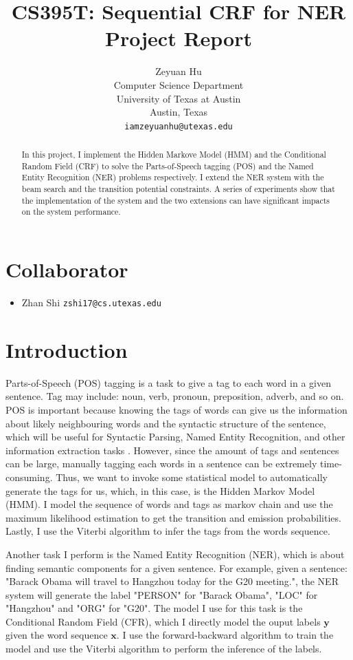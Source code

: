 \documentclass[11pt,a4paper]{article}
\title{CS395T: Sequential CRF for NER Project Report}
\author{Zeyuan Hu \\
  Computer Science Department \\
  University of Texas at Austin \\
  Austin, Texas \\
  {\tt iamzeyuanhu@utexas.edu} \\
}
\date{}
\begin{document}
\maketitle

\begin{abstract}
In this project, I implement the Hidden Markove Model (HMM) and the Conditional Random Field (CRF)
to solve the Parts-of-Speech tagging (POS) and the Named Entity Recognition (NER) problems
respectively. I extend the NER system with the beam search and the transition potential constraints.
A series of experiments show that the implementation of the system and the two extensions can have
significant impacts on the system performance.
\end{abstract}

\section{Collaborator}

\begin{itemize}
\item Zhan Shi {\tt zshi17@cs.utexas.edu}
\end{itemize}

\section{Introduction}

Parts-of-Speech (POS) tagging is a task to give a tag to each word in a given sentence.
Tag may include: noun, verb, pronoun, preposition, adverb, and so on. 
POS is important because knowing the tags of words can
give us the information about likely neighbouring words 
and the syntactic structure of the sentence,
which will be useful for Syntactic Parsing, Named Entity Recognition, and other 
information extraction tasks \cite[Chapter~10]{Jurafsky:2017}. However, since the amount
of tags and sentences can be large, manually tagging each words in a sentence
can be extremely time-consuming. Thus, we want to invoke some statistical model
to automatically generate the tags for us, which, in this case, is the Hidden Markov Model (HMM). 
I model the sequence of words and tags as markov chain
and use the maximum likelihood estimation to get the transition and emission probabilities.
Lastly, I use the Viterbi algorithm to infer the tags from the words sequence.

Another task I perform is the Named Entity Recognition (NER), which is about 
finding semantic components for a given sentence. For example, given a
sentence: "Barack Obama will travel to Hangzhou today for the G20 meeting.",
the NER system will generate the label "PERSON" for "Barack Obama", "LOC" for "Hangzhou" and "ORG" for "G20". 
The model I use for this task is the Conditional Random Field (CFR),
which I directly model the ouput labels $\boldsymbol{y}$ given the word sequence $\boldsymbol{x}$.
I use the forward-backward algorithm to train the model and use the Viterbi algorithm
to perform the inference of the labels.
\end{document}
